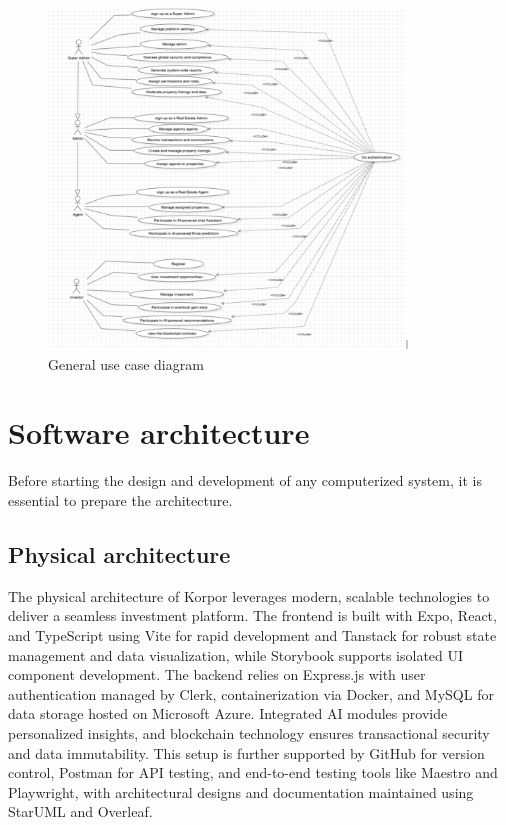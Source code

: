 \begin{figure}[htbp]
    \centering
    \includegraphics[width=0.85\textwidth]{images/diagram de case d utilisation general.png}
    \caption{General use case diagram}
    \label{fig:use-case-diagram}
\end{figure}

\section{Software architecture}

Before starting the design and development of any computerized system, it is essential to prepare the architecture.

\subsection{Physical architecture}

 The physical architecture of Korpor leverages modern, scalable technologies to deliver a seamless investment platform. The frontend is built with Expo, React, and TypeScript using Vite for rapid development and Tanstack for robust state management and data visualization, while Storybook supports isolated UI component development. The backend relies on Express.js with user authentication managed by Clerk, containerization via Docker, and MySQL for data storage hosted on Microsoft Azure. Integrated AI modules provide personalized insights, and blockchain technology ensures transactional security and data immutability. This setup is further supported by GitHub for version control, Postman for API testing, and end-to-end testing tools like Maestro and Playwright, with architectural designs and documentation maintained using StarUML and Overleaf.

